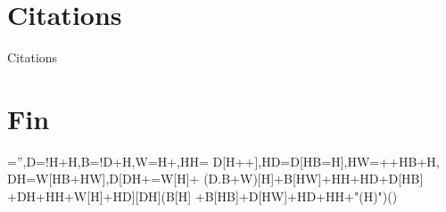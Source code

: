\documentclass[aspectratio=169]{beamer}
\begin{document}
\section{Citations}
\begin{frame}[allowframebreaks]{Citations}
	\printbibliography
\end{frame}

\section*{Fin}
\begin{frame}
	\centering
	\vfill
	\fontsize{25}{35}='',{\color{red}D}=!H+H,{\color{red}B}=!D+H,{\color{red}W}=H+{},HH=
	D[H++],HD=D[HB=H],HW=++HB+H,
	DH=W[HB+HW],D[DH+=W[H]+
	(D.B+W)[H]+B[HW]+HH+HD+D[HB]
	+DH+HH+W[H]+HD][DH](B[H]
	+B[HB]+D[HW]+HD+HH+"(H)")()
	\vfill
\end{frame}


\end{document}
